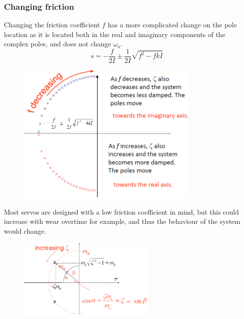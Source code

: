 \documentclass[class=report, crop=false, 12pt,a4paper]{standalone}
\begin{document}
\subsubsection{Changing friction}
Changing the friction coefficient $f$ has a more complicated change on the pole location as it is located both in the real and imaginary components of the complex poles, and does not change $\omega_n$.
\begin{equation}
  s = - \frac{f}{2I} \pm \frac{1}{2I} \sqrt{f^2 - fkI}
\end{equation}
\begin{figure}[H]
  \centerline{\includegraphics[width = 0.8\textwidth]{../img/diagram98.png}}
  \caption{}
\end{figure}
Most servos are designed with a low friction coefficient in mind, but this could increase with wear overtime for example, and thus the behaviour of the system would change.
\begin{figure}[H]
  \centerline{\includegraphics[width = 0.6\textwidth]{../img/diagram99.png}}
  \caption{}
\end{figure}
\end{document}

